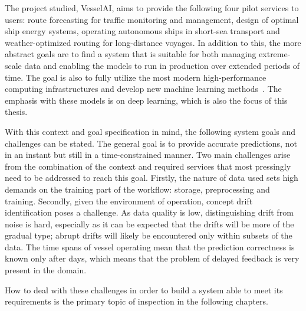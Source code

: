 The project studied, VesselAI, aims to provide the following four pilot services to users: route forecasting for traffic monitoring and management, design of optimal ship energy systems, operating autonomous ships in short-sea transport and weather-optimized routing for long-distance voyages. In addition to this, the more abstract goals are to find a system that is suitable for both managing extreme-scale data and enabling the models to run in production over extended periods of time. The goal is also to fully utilize the most modern high-performance computing infrastructures and develop new machine learning methods~\cite{D1.1}. The emphasis with these models is on deep learning, which is also the focus of this thesis.

With this context and goal specification in mind, the following system goals and challenges can be stated. The general goal is to provide accurate predictions, not in an instant but still in a time-constrained manner. Two main challenges arise from the combination of the context and required services that most pressingly need to be addressed to reach this goal. Firstly, the nature of data used sets high demands on the training part of the workflow: storage, preprocessing and training. Secondly, given the environment of operation, concept drift identification poses a challenge. As data quality is low, distinguishing drift from noise is hard, especially as it can be expected that the drifts will be more of the gradual type; abrupt drifts will likely be encountered only within subsets of the data. The time spans of vessel operating mean that the prediction correctness is known only after days, which means that the problem of delayed feedback is very present in the domain.

How to deal with these challenges in order to build a system able to meet its requirements is the primary topic of inspection in the following chapters.





